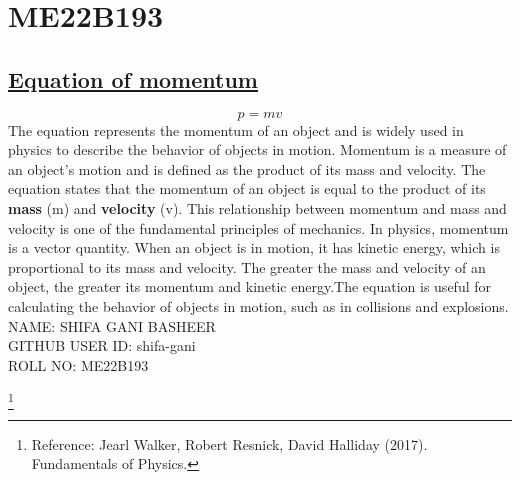\documentclass{article}
\begin{document}
\section{ME22B193}
\subsection{\underline{Equation of momentum}}
\label{eqn}
\begin{equation}
    p=mv
\end{equation}
The equation represents the momentum of an object and is widely used in physics to describe the behavior of objects in motion. Momentum is a measure of an object's motion and is defined as the product of its mass and velocity. The equation states that the momentum of an object is equal to the product of its \textbf{ mass} (m) and \textbf{ velocity} (v). This relationship between momentum and mass and velocity is one of the fundamental principles of mechanics. In physics, momentum is a vector quantity. When an object is in motion, it has kinetic energy, which is proportional to its mass and velocity. The greater the mass and velocity of an object, the greater its momentum and kinetic energy.The equation is useful for calculating the behavior of objects in motion, such as in collisions and explosions.\\ 
NAME: SHIFA GANI BASHEER\\
GITHUB USER ID: shifa-gani\\
ROLL NO: ME22B193

\footnote{Reference:  Jearl Walker, Robert Resnick, David Halliday (2017). Fundamentals of Physics.}
\end{document}
